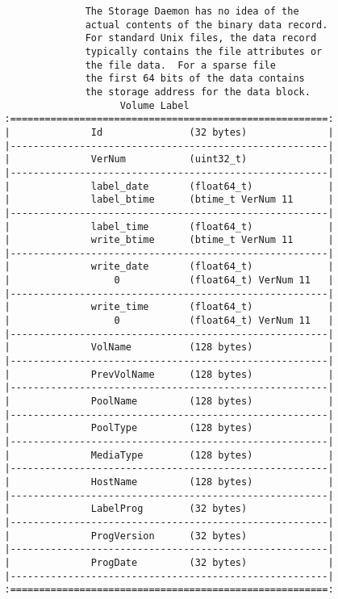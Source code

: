\begin{verbatim}
                 The Storage Daemon has no idea of the
                 actual contents of the binary data record.
                 For standard Unix files, the data record
                 typically contains the file attributes or
                 the file data.  For a sparse file
                 the first 64 bits of the data contains
                 the storage address for the data block.
                       Volume Label
   :=======================================================:
   |              Id               (32 bytes)              |
   |-------------------------------------------------------|
   |              VerNum           (uint32_t)              |
   |-------------------------------------------------------|
   |              label_date       (float64_t)             |
   |              label_btime      (btime_t VerNum 11      |
   |-------------------------------------------------------|
   |              label_time       (float64_t)             |
   |              write_btime      (btime_t VerNum 11      |
   |-------------------------------------------------------|
   |              write_date       (float64_t)             |
   |                  0            (float64_t) VerNum 11   |
   |-------------------------------------------------------|
   |              write_time       (float64_t)             |
   |                  0            (float64_t) VerNum 11   |
   |-------------------------------------------------------|
   |              VolName          (128 bytes)             |
   |-------------------------------------------------------|
   |              PrevVolName      (128 bytes)             |
   |-------------------------------------------------------|
   |              PoolName         (128 bytes)             |
   |-------------------------------------------------------|
   |              PoolType         (128 bytes)             |
   |-------------------------------------------------------|
   |              MediaType        (128 bytes)             |
   |-------------------------------------------------------|
   |              HostName         (128 bytes)             |
   |-------------------------------------------------------|
   |              LabelProg        (32 bytes)              |
   |-------------------------------------------------------|
   |              ProgVersion      (32 bytes)              |
   |-------------------------------------------------------|
   |              ProgDate         (32 bytes)              |
   |-------------------------------------------------------|
   :=======================================================:
                 

\end{verbatim}
